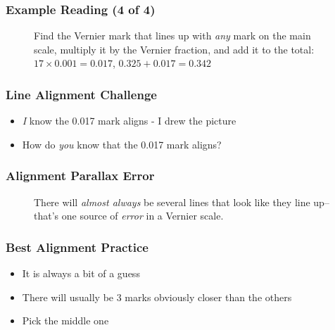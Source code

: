\begin{frame}
	\frametitle{Example Reading (4 of 4)}
    
    \begin{figure}
        \centering
        \resizebox{0.75\columnwidth}{!}{
            
            }
        
        \vspace{0.5em}
        {\footnotesize Find the Vernier mark that lines up with \emph{any} mark on the main scale, multiply it by the Vernier fraction, and add it to the total: $17 \times 0.001=0.017$, $0.325+0.017=0.342$\par}
    \end{figure} 
\end{frame}

\begin{frame}
	\frametitle{Line Alignment Challenge}

    \begin{itemize}[<+- | alert@+>]
        \item \emph{I} know the 0.017 mark aligns - I drew the picture
        \item How do \emph{you} know that the 0.017 mark aligns?
    \end{itemize}    
\end{frame}

\begin{frame}
	\frametitle{Alignment Parallax Error}

    \begin{figure}
        \centering
        \resizebox{0.5\columnwidth}{!}{
            
            }
        
        \vspace{0.5em}
        {\footnotesize There will \emph{almost always} be several lines that look like they line up--that's one source of \emph{error} in a Vernier scale.\par}
    \end{figure}   
\end{frame}

\begin{frame}
	\frametitle{Best Alignment Practice}

    \begin{itemize}[<+- | alert@+>]
        \item It is always a bit of a guess
        \item There will usually be 3 marks obviously closer than the others
        \item Pick the middle one
    \end{itemize}    
\end{frame}

